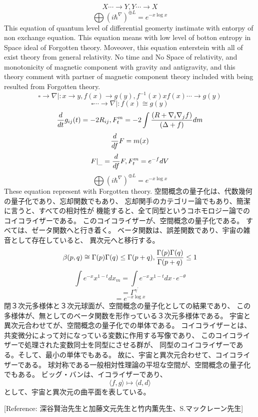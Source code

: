 \documentclass{jsarticle}
\begin{document}
   $$ X \dotsi \to Y, Y \dotsi \to X $$
   $$ \bigoplus(i \hbar^{\nabla})^{\oplus L} = e^{-x \log x} $$
   This equation of quantum level of differential geomerty
   instimate with entorpy of non exchange equation.
   This equation means with low level of botton entropy in Space ideal of
   Forgotten theory. Moveover, this equation enterstein with all of exist
   theory from general relativity.
   No time and No Space of relativity, and monotonicity of magnetic component
   with gravity and antigravity, and this theory comment with partner of
   magnetic component theory included with being resulted from Forgotten
   theory.
   $$ \square \to \nabla |: x \to y, f(x) \to g(y), f^{-1}(x)xf(x) 
   \dotsi \to g(y) $$
   $$ \square \dotsi \to \nabla |: f(x) \cong g(y) $$
   $$ {d \over dt}g_{ij}(t) = - 2 R_{ij}, F^m_t = -2\int{{(R + \nabla_i \nabla
   _j f)} \over {(\Delta + f)}}dm $$
   $$ {d \over df}F = m(x) $$
   $$ F|_{\_} = {d \over df}F, F^m_t = e^{-f}dV $$
   $$ \bigoplus(i \hbar^{\nabla})^{\oplus L} = e^{-x \log x} $$
   These equation represent with Forgotten theory.
   空間概念の量子化は、代数幾何の量子化であり、忘却関数でもあり、
   忘却関手のカテゴリー論でもあり、簡潔に言うと、すべての相対性が
   機能すると、全て同型というコホモロジー論でのコイコライザーである。
   このコイコライザーが、空間概念の量子化である。
   すべては、ゼータ関数へと行き着く。
   ベータ関数は、誤差関数であり、宇宙の雑音として存在していると、
   異次元へと移行する。
   $$ \beta(p,q) \cong {\Gamma(p)\Gamma(q) \le \Gamma(p+q)}, 
   {{\Gamma(p)\Gamma(q)} \over \Gamma(p+q)} \le 1 $$
   $$ \int e^{-x}x^{1-t}dx_m = \int e^{-x}x^{1-t}dx\cdot e^{-\theta} $$
   $$ = \Gamma^{{\gamma}^{'}} $$
   $$ = e^{-x \log x} $$
   閉３次元多様体と３次元球面が、空間概念の量子化としての結果であり、
   この多様体が、無としてのベータ関数を形作っている３次元多様体である。
   宇宙と異次元合わせてが、空間概念の量子化での単体である。
   コイコライザーとは、共変微分によって対になっている変数に作用する写像であり、
   このコイコライザーで処理された変数同士を同型にさせる群が、
   同型のコイコライザーである。そして、最小の単体でもある。
   故に、宇宙と異次元合わせて、コイコライザーである。
   球対称である一般相対性理論の平坦な空間が、空間概念の量子化でもある。
   ビッグ・バンは、イコライザーであり、
   $$ \langle f,g\rangle \mapsto \langle d,d\rangle $$
   として、宇宙と異次元の曲平面を表している。
 
   [Reference: 深谷賢治先生と加藤文元先生と竹内薫先生、S.マックレーン先生]
\end{document}

